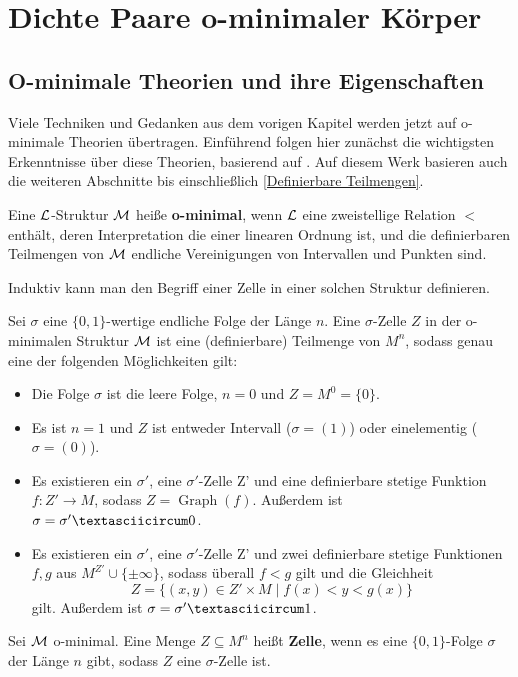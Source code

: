 \chapter{Dichte Paare o-minimaler Körper}
\section{O-minimale Theorien und ihre Eigenschaften}

Viele Techniken und Gedanken aus dem vorigen Kapitel werden jetzt auf o-minimale Theorien übertragen. Einführend folgen hier zunächst die wichtigsten Erkenntnisse über diese Theorien, basierend auf \cite{vdDZellzerlegung}. Auf diesem Werk basieren auch die weiteren Abschnitte bis einschließlich \ref{Definierbare Teilmengen}.

\begin{definition}
	Eine $\mathcal{L}$-Struktur $\mathcal{M}$ heiße \textbf{o-minimal}, wenn $\mathcal{L}$ eine zweistellige Relation $<$ enthält, deren Interpretation die einer linearen Ordnung ist, und die definierbaren Teilmengen von $\mathcal{M}$ endliche Vereinigungen von Intervallen und Punkten sind.
\end{definition}

Induktiv kann man den Begriff einer Zelle in einer solchen Struktur definieren.
\begin{definition}
	Sei $\sigma$ eine $\{0,1\}$-wertige endliche Folge der Länge $n$. Eine $\sigma$-Zelle $Z$ in der o-minimalen Struktur $\mathcal{M}$ ist eine (definierbare) Teilmenge von $M^n$, sodass genau eine der folgenden Möglichkeiten gilt:
	\begin{itemize}
		\item Die Folge $\sigma$ ist die leere Folge, $n=0$ und $Z=M^0=\{0\}$.
		\item Es ist $n=1$ und $Z$ ist entweder Intervall ($\sigma=(1)$) oder einelementig ($\sigma=(0)$).
		\item Es existieren ein $\sigma'$, eine $\sigma'$-Zelle Z' und eine definierbare stetige Funktion\linebreak$f:Z'\rightarrow M$, sodass $Z=\operatorname{Graph}(f)$. Außerdem ist $\sigma=\sigma'\textasciicircum0$.
		\item Es existieren ein $\sigma'$, eine $\sigma'$-Zelle Z' und zwei definierbare stetige Funktionen $f,g$ aus $M^{Z'}\cup\{\pm\infty\}$, sodass überall $f<g$ gilt und die Gleichheit $$Z=\{(x,y)\in Z'\times M\mid f(x)<y<g(x)\}$$ gilt. Außerdem ist $\sigma=\sigma'\textasciicircum1$.
	\end{itemize}
\end{definition}
\begin{definition}
	Sei $\mathcal{M}$ o-minimal. Eine Menge $Z\subseteq M^n$ heißt \textbf{Zelle}, wenn es eine $\{0,1\}$-Folge $\sigma$ der Länge $n$ gibt, sodass $Z$ eine $\sigma$-Zelle ist.
\end{definition}

